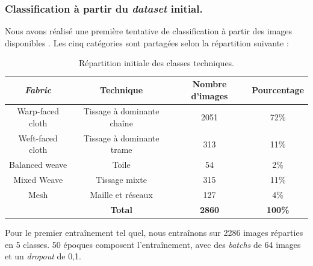 \subsubsection{Classification à partir du \textit{dataset} initial.}
Nous avons réalisé une première tentative de classification à partir des images disponibles . Les cinq catégories sont partagées selon la répartition suivante :  
\begin{table}[!h]
    \centering
    \begin{tabular}{|c|c|c|c|}
        \hline
          \cellcolor{blue!20}\textbf{\textit{Fabric}} & \cellcolor{blue!20}\textbf{Technique} & \cellcolor{blue!20}\textbf{Nombre d'images}& \cellcolor{blue!20} \textbf{Pourcentage} \\ \hline \hline
         Warp-faced cloth & Tissage à dominante chaîne & 2051 & 72\% \\ \hline
         Weft-faced cloth & Tissage à dominante trame & 313 & 11\% \\ \hline
         Balanced weave & Toile & 54 & 2\% \\ \hline
         Mixed Weave & Tissage mixte & 315 &  11\% \\ \hline
         Mesh & Maille et réseaux & 127 &  4\%  \\ \hline
          & \textbf{Total} & \textbf{2860} &  \textbf{100\%}  \\ \hline
    \end{tabular}
    \caption{Répartition initiale des classes techniques.}
    \label{tab:classes_init}
\end{table}

Pour le premier entraînement tel quel, nous entraînons sur 2286 images réparties en 5 classes. 50 époques composent l'entraînement, avec des \textit{batchs} de 64 images et un \textit{dropout} de 0,1.

